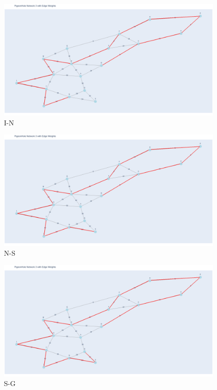 \documentclass[11pt]{book}
\renewcommand{\=}[1]{\stackrel{#1}{=}} %
\theoremstyle{definition}
\theoremstyle{remark}
\begin{document}
\begin{figure}
    \centering
    \includegraphics[width=1\linewidth]{q5_plots/13.png}
    \caption{I-N}
    \label{fig:enter-label}
\end{figure}
\begin{figure}
    \centering
    \includegraphics[width=1\linewidth]{q5_plots/14.png}
    \caption{N-S}
    \label{fig:enter-label}
\end{figure}
\begin{figure}
    \centering
    \includegraphics[width=1\linewidth]{q5_plots/15.png}
    \caption{S-G}
    \label{fig:enter-label}
\end{figure}
\end{document}
